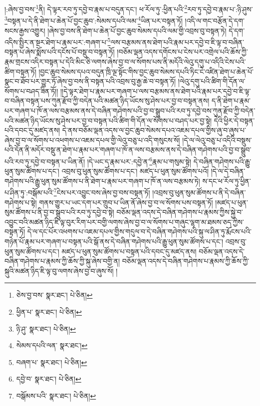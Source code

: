 །:ཞེས་བྱ་བས་\footnote{ཅེས་བྱ་བས་  སྣར་ཐང་།  པེ་ཅིན། }ནི། དེ་ལྟར་རབ་ཏུ་དབྱེ་བ་རྣམ་པ་བདུན་དང་། ཕ་རོལ་ཏུ་:ཕྱིན་པའི་\footnote{ཕྱིན་པ་  སྣར་ཐང་།  པེ་ཅིན། }རབ་ཏུ་དབྱེ་བ་རྣམ་པ་:ཉི་ཤུས་\footnote{ཉི་ཤུ་  སྣར་ཐང་།  པེ་ཅིན། }བསྟན་པ་དེ་ནི་ཐེག་པ་ཆེན་པོ་བྱང་ཆུབ་:སེམས་དཔའི་ལམ་\footnote{སེམས་དཔའི་ལན་  སྣར་ཐང་། }ཡིན་པར་བསྟན་ཏོ། །འདི་ལ་གང་བརྩོན་དེ་དག་སངས་རྒྱས་འགྱུར། །ཞེས་བྱ་བས་ནི་ཐེག་པ་ཆེན་པོ་བྱང་ཆུབ་སེམས་དཔའི་ལམ་གྱི་འབྲས་བུ་བསྟན་ཏེ། དེ་དག་འདིས་སྤྱིར་ན་སྔར་ཐེག་པ་རྣམ་པར་:གཞག་པ་\footnote{བཞག་པ་  སྣར་ཐང་།  པེ་ཅིན། }ལས་བརྩམས་ནས་ཐེག་པའི་རྣམ་པར་དབྱེ་བ་ཇི་ལྟ་བ་བཞིན་བསྟན་པ་ཞེས་སྨོས་པའི་དངོས་པོ་བསྡུ་བ་བསྟན་ཏོ། །བཅོམ་ལྡན་འདས་དགོངས་པ་ངེས་པར་འགྲེལ་པའི་ཆོས་ཀྱི་རྣམ་གྲངས་འདིར་བསྟན་པ་དེའི་མིང་ཅི་ལགས་ཞེས་བྱ་བ་ལ་སོགས་པས་ནི་མདོའི་ལེའུ་དགུ་པ་འདིའི་ངེས་པའི་ཚིག་བསྟན་ཏོ། །བྱང་ཆུབ་སེམས་དཔའ་བདུན་ཁྲི་ལྔ་སྟོང་གིས་བྱང་ཆུབ་སེམས་དཔའི་ཏིང་ངེ་འཛིན་ཐེག་པ་ཆེན་པོ་སྣང་བ་ཐོབ་པར་གྱུར་ཏོ་ཞེས་བྱ་བས་ནི་བསྟན་པའི་འབྲས་བུ་རྒྱ་ཆེ་བ་བསྟན་ཏོ། །ལེའུ་དགུ་པའི་ཚིག་གི་དོན་ལ་སོགས་པ་བཤད་ཟིན་ཏོ།། །།དེ་ལྟར་ཐེག་པ་རྣམ་པར་གཞག་པ་ལས་བརྩམས་ནས་ཐེག་པའི་རྣམ་པར་དབྱེ་བ་ཇི་ལྟ་བ་བཞིན་བསྟན་པས་ཀུན་རྫོབ་ཀྱི་བདེན་པའི་མཚན་ཉིད་ཡོངས་སུ་ཤེས་པར་བྱ་བ་བསྟན་ནས། ད་ནི་ཐེག་པ་རྣམ་པར་གཞག་པ་ཁོ་ན་ལས་བརྩམས་ནས་དེ་བཞིན་གཤེགས་པའི་བྱ་བ་སྒྲུབ་པའི་རབ་ཏུ་དབྱེ་བས་ཀུན་རྫོབ་ཀྱི་བདེན་པའི་མཚན་ཉིད་ཡོངས་སུ་ཤེས་པར་བྱ་བ་བསྟན་པའི་ཚིག་གི་དོན་ལ་སོགས་པ་བཤད་པར་བྱ་སྟེ། དེའི་ཕྱིར་དེ་བསྟན་པའི་དབང་དུ་མཛད་ནས། དེ་ནས་བཅོམ་ལྡན་འདས་ལ་བྱང་ཆུབ་སེམས་དཔའ་འཇམ་དཔལ་གྱིས་ཞུ་བ་ཞུས་པ་ཞེས་བྱ་བ་ལ་སོགས་པ་འཕགས་པ་འཇམ་དཔལ་གྱི་ལེའུ་བཅུ་པ་འདི་གསུངས་སོ། །དེ་ལ་ལེའུ་བཅུ་པ་འདིའི་བསྡུས་པའི་དོན་ནི་མདོར་བསྡུ་ན་ཐེག་པ་རྣམ་པར་གཞག་པ་ཁོ་ན་ལས་བརྩམས་ནས་དེ་བཞིན་གཤེགས་པའི་བྱ་བ་སྒྲུབ་པའི་རབ་ཏུ་དབྱེ་བ་བསྟན་པ་ཡིན་ནོ། །དེ་ཡང་ད་རྣམ་པར་:དབྱེ་ན་\footnote{དབྱེ་བ་  སྣར་ཐང་།  པེ་ཅིན། }རྣམ་པ་གསུམ་སྟེ། དེ་བཞིན་གཤེགས་པའི་རྒྱུ་ཕུན་སུམ་ཚོགས་པ་དང་། འབྲས་བུ་ཕུན་སུམ་ཚོགས་པ་དང་། མཛད་པ་ཕུན་སུམ་ཚོགས་པའོ། །དེ་ལ་དེ་བཞིན་གཤེགས་པའི་རྒྱུ་ཕུན་སུམ་ཚོགས་པ་ནི་ཐེག་པ་རྣམ་པར་གཞག་པ་ཁོ་ན་ལས་བརྩམས་ཏེ། ས་དང་ཕ་རོལ་ཏུ་ཕྱིན་པ་ཤིན་ཏུ་:བསྒོམ་པའི་\footnote{བསྒོམས་པའི་  སྣར་ཐང་།  པེ་ཅིན། }ངེས་པར་འབྱུང་བས་ཞེས་བྱ་བས་བསྟན་ཏོ། །འབྲས་བུ་ཕུན་སུམ་ཚོགས་པ་ནི་དེ་བཞིན་གཤེགས་པ་སྟེ། གནས་གྱུར་པ་ཡང་དག་པར་གྲུབ་པ་ཡིན་ནོ་ཞེས་བྱ་བ་ལ་སོགས་པས་བསྟན་ཏོ། །མཛད་པ་ཕུན་སུམ་ཚོགས་པ་ནི་བྱ་བ་སྒྲུབ་པའི་རབ་ཏུ་དབྱེ་བ་སྟེ། བཅོམ་ལྡན་འདས་དེ་བཞིན་གཤེགས་པ་རྣམས་ཀྱིས་སྐྱེ་བ་འབྱུང་བའི་མཚན་ཉིད་ཇི་ལྟ་བུར་རིག་པར་བགྱི་ལགས་ཞེས་བྱ་བ་ལ་སོགས་པ་གཞུང་ལྷག་མ་ཐམས་ཅད་ཀྱིས་བསྟན་ཏོ། དེ་ལ་དང་པོར་འཕགས་པ་འཇམ་དཔལ་གྱིས་གདུལ་བ་དེ་བཞིན་གཤེགས་པའི་སྐུ་ལ་ཤིན་ཏུ་རྨོངས་པའི་གཉེན་པོ་རྣམ་པར་གཞག་པ་བསྟན་པའི་སྒོ་ནས་དེ་བཞིན་གཤེགས་པའི་རྒྱུ་ཕུན་སུམ་ཚོགས་པ་དང་། འབྲས་བུ་ཕུན་སུམ་ཚོགས་པ་དང་། མཛད་པ་ཕུན་སུམ་ཚོགས་པ་བསྟན་པའི་དབང་དུ་མཛད་ནས། བཅོམ་ལྡན་འདས་དེ་བཞིན་གཤེགས་པ་རྣམས་ཀྱི་ཆོས་ཀྱི་སྐུ་ཞེས་བགྱི་ན། བཅོམ་ལྡན་འདས་དེ་བཞིན་གཤེགས་པ་རྣམས་ཀྱི་ཆོས་ཀྱི་སྐུའི་མཚན་ཉིད་ཇི་ལྟ་བུ་ལགས་ཞེས་བྱ་བ་ཞུས་སོ། །
